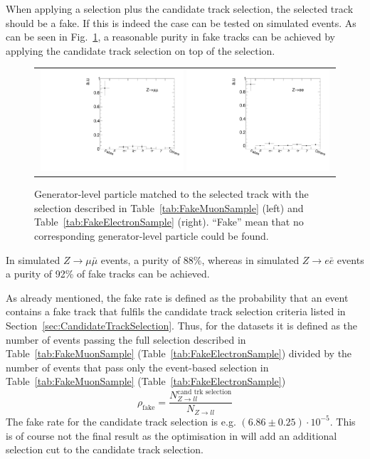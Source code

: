 When applying a \Zlep selection plus the candidate track selection, the selected track should be a fake.
If this is indeed the case can be tested on simulated \Zlep events.
As can be seen in Fig.~\ref{fig:BkgComposition}, a reasonable purity in fake tracks can be achieved by applying the candidate track selection on top of the \Zlep selection.
\begin{figure}[!b]
  \centering 
  \begin{tabular}{c}
    \includegraphics[width=0.49\textwidth]{figures/analysis/Background/ParticleCompositionInFakeCS_Mu.pdf}
    \includegraphics[width=0.49\textwidth]{figures/analysis/Background/ParticleCompositionInFakeCS_Ele.pdf}
  \end{tabular}
  \caption{Generator-level particle matched to the selected track with the selection described in Table~\ref{tab:FakeMuonSample} (left) and Table~\ref{tab:FakeElectronSample} (right). ``Fake'' mean that no corresponding generator-level particle could be found. }
  \label{fig:BkgComposition}
\end{figure}
In simulated $Z\rightarrow\mu\bar{\mu}$ events, a purity of 88\%, whereas in simulated $Z\rightarrow e\bar{e}$ events a purity of 92\% of fake tracks can be achieved.


As already mentioned, the fake rate is defined as the probability that an event contains a fake track that fulfils the candidate track selection criteria listed in Section~\ref{sec:CandidateTrackSelection}.
Thus, for the \Zlep datasets it is defined as the number of events passing the full selection described in Table~\ref{tab:FakeMuonSample} (Table~\ref{tab:FakeElectronSample}) divided by the number of events that pass only the event-based selection in Table~\ref{tab:FakeMuonSample} (Table~\ref{tab:FakeElectronSample})
\begin{equation*}
\rho_{\text{fake}} = \frac{N_{Z\rightarrow ll}^{\text{cand trk selection}}}{N_{Z\rightarrow ll}}
\end{equation*}
The fake rate for the candidate track selection is e.g. $\left( 6.86 \pm 0.25 \right) \cdot 10^{-5}$. 
This is of course not the final result as the optimisation in \pt will add an additional \pt selection cut to the candidate track selection.


